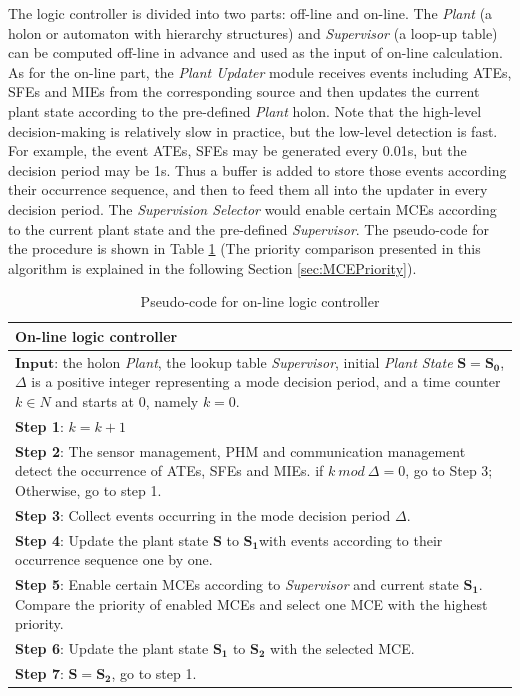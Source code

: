 The logic controller is divided into two parts: off-line and on-line. The \textit{Plant} (a holon or automaton with hierarchy structures) and \textit{Supervisor} (a loop-up table) can be computed off-line in advance and used as the input of on-line calculation. As for the on-line part, the \textit{Plant Updater} module receives events including ATEs, SFEs and MIEs from the corresponding source and then updates the current plant state according to the pre-defined \textit{Plant} holon. Note that the high-level decision-making is relatively slow in practice, but the low-level detection is fast. For example, the event ATEs, SFEs may be generated every 0.01s, but the decision period may be 1s. Thus a buffer is added to store those events according their occurrence sequence, and then to feed them all into the updater in every decision period. The \textit{Supervision Selector} would enable certain MCEs according to the current plant state and the pre-defined \textit{Supervisor}. The pseudo-code for the  procedure is shown in Table \ref{alg:decisionperiod} (The priority comparison presented in this algorithm is explained in the following Section \ref{sec:MCEPriority}).

\begin{table}
	\caption{Pseudo-code for on-line logic controller}
	\label{alg:decisionperiod}
	\begin{tabular}{p{15cm}}
		\hline \hline 
		On-line logic controller\\
		\hline \hline 
		$\mathbf{Input}$: the holon \textit{Plant}, the lookup table \textit{Supervisor}, initial \textit{Plant State} $ \mathbf{S}=\mathbf{S_0} $, $ \Delta $ is a positive integer representing a mode decision period, and a time counter $ k\in N $ and starts at 0, namely $ k=0 $.\\
		\textbf{Step 1}:  $ k = k + 1 $ \\
		\textbf{Step 2}: The sensor management, PHM and communication management detect the occurrence of ATEs, SFEs and MIEs. if $ k\ mod\ \Delta =0 $, go to Step 3; Otherwise, go to step 1.\\
		\textbf{Step 3}: Collect events occurring in the mode decision period $ \Delta $. \\
		\textbf{Step 4}: Update the plant state $ \mathbf{S} $ to $ \mathbf{S_1} $with events according to their occurrence sequence one by one. \\
		\textbf{Step 5}: Enable certain MCEs according to \textit{Supervisor} and current state $ \mathbf{S_1} $. Compare the priority of enabled MCEs and select one MCE with the highest priority. \\
		\textbf{Step 6}: Update the plant state $ \mathbf{S_1} $ to $ \mathbf{S_2} $ with the selected MCE. \\
		\textbf{Step 7}: $ \mathbf{S}=\mathbf{S_2} $, go to step 1. \\
		\hline \hline 
	\end{tabular}
\end{table}

